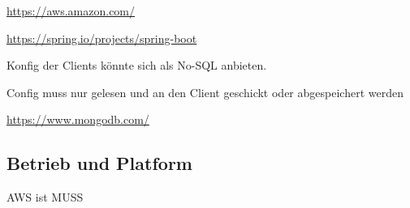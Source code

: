 \url{https://aws.amazon.com/}

    \url{https://spring.io/projects/spring-boot}

    Konfig der Clients könnte sich als No-SQL anbieten.

    Config muss nur gelesen und an den Client geschickt oder abgespeichert werden

    \url{https://www.mongodb.com/}


\subsection{Betrieb und Platform}\label{subsec:betrieb-und-platform}

AWS ist MUSS